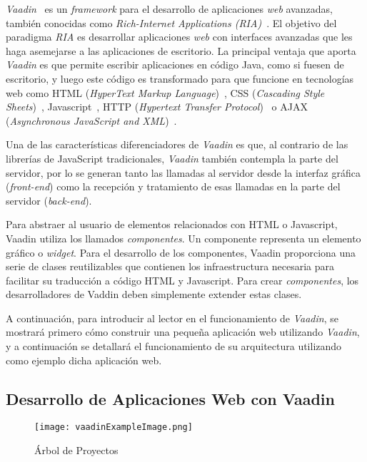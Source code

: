 

\emph{Vaadin}~\cite{vaadin} es un \emph{framework} para el desarrollo de aplicaciones \emph{web} avanzadas, también conocidas como \emph{Rich-Internet Applications (RIA)}~\cite{ria}. El objetivo del paradigma \emph{RIA} es desarrollar aplicaciones \emph{web} con interfaces avanzadas que les haga asemejarse a las aplicaciones de escritorio. La principal ventaja que aporta \emph{Vaadin} es que permite escribir aplicaciones en código Java, como si fuesen de escritorio, y luego este código es transformado para que funcione en tecnologías web como HTML (\emph{HyperText Markup Language})~\cite{html}, CSS (\emph{Cascading Style Sheets})~\cite{css}, Javascript~\cite{javascript}, HTTP (\emph{Hypertext Transfer Protocol})~\cite{http} o AJAX (\emph{Asynchronous JavaScript and XML})~\cite{ajax}.

Una de las características diferenciadores de \emph{Vaadin} es que, al contrario de las librerías de JavaScript tradicionales, \emph{Vaadin} también contempla la parte del servidor, por lo se generan tanto las llamadas al servidor desde la interfaz gráfica (\emph{front-end}) como la recepción y tratamiento de esas llamadas en la parte del servidor (\emph{back-end}).

Para abstraer al usuario de elementos relacionados con HTML o Javascript, Vaadin utiliza los llamados \emph{componentes}. Un componente representa un elemento gráfico o \emph{widget}. Para el desarrollo de los componentes, Vaadin proporciona una serie de clases reutilizables que contienen los infraestructura necesaria para facilitar su traducción a código HTML y Javascript. Para crear \emph{componentes}, los desarrolladores de Vaddin deben simplemente extender estas clases.

A continuación, para introducir al lector en el funcionamiento de \emph{Vaadin}, se mostrará primero cómo construir una pequeña aplicación web utilizando \emph{Vaadin}, y a continuación se detallará el funcionamiento de su arquitectura utilizando como ejemplo dicha aplicación web. 

\subsection{Desarrollo de Aplicaciones Web con Vaadin}

\begin{figure}[!tb]
	\centering
	\texttt{[image: vaadinExampleImage.png]}
	\caption{Árbol de Proyectos}
	\label{fig:vaadinExampleImage}
\end{figure}

